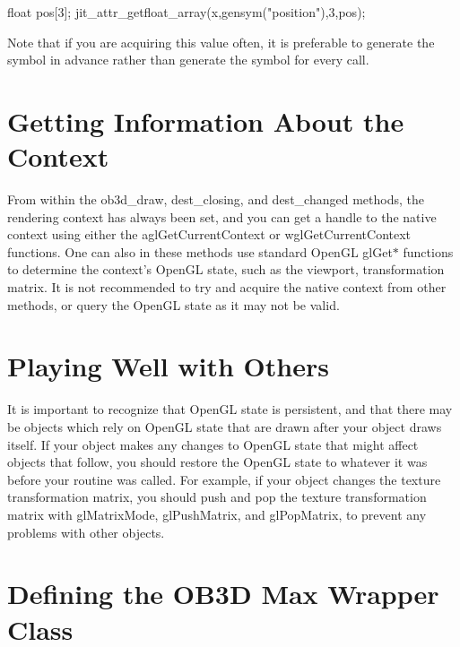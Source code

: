 \begin{DoxyCode}
   float pos[3];
   jit_attr_getfloat_array(x,gensym("position"),3,pos);
\end{DoxyCode}


Note that if you are acquiring this value often, it is preferable to generate the symbol in advance rather than generate the symbol for every call.\hypertarget{chapter_jit_ob3ddetails_chapter_jit_ob3ddetails_context}{}\section{Getting Information About the Context}\label{chapter_jit_ob3ddetails_chapter_jit_ob3ddetails_context}
From within the ob3d\_\-draw, dest\_\-closing, and dest\_\-changed methods, the rendering context has always been set, and you can get a handle to the native context using either the aglGetCurrentContext or wglGetCurrentContext functions. One can also in these methods use standard OpenGL glGet$\ast$ functions to determine the context's OpenGL state, such as the viewport, transformation matrix. It is not recommended to try and acquire the native context from other methods, or query the OpenGL state as it may not be valid.\hypertarget{chapter_jit_ob3ddetails_chapter_jit_ob3ddetails_play}{}\section{Playing Well with Others}\label{chapter_jit_ob3ddetails_chapter_jit_ob3ddetails_play}
It is important to recognize that OpenGL state is persistent, and that there may be objects which rely on OpenGL state that are drawn after your object draws itself. If your object makes any changes to OpenGL state that might affect objects that follow, you should restore the OpenGL state to whatever it was before your routine was called. For example, if your object changes the texture transformation matrix, you should push and pop the texture transformation matrix with glMatrixMode, glPushMatrix, and glPopMatrix, to prevent any problems with other objects.\hypertarget{chapter_jit_ob3ddetails_chapter_jit_ob3ddetails_wrapdef}{}\section{Defining the OB3D Max Wrapper Class}\label{chapter_jit_ob3ddetails_chapter_jit_ob3ddetails_wrapdef}
